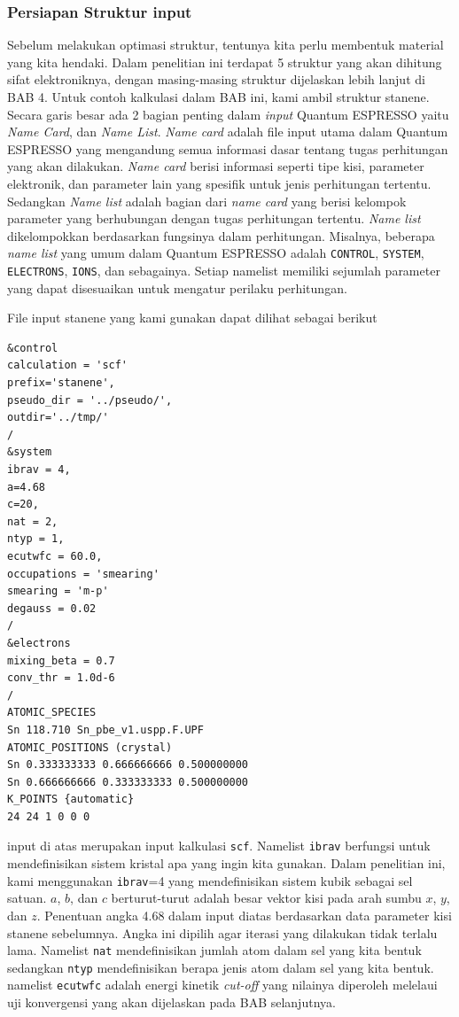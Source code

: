 \subsubsection{Persiapan Struktur input}
Sebelum melakukan optimasi struktur, tentunya kita perlu membentuk material yang kita hendaki. Dalam penelitian ini terdapat 5 struktur yang akan dihitung sifat elektroniknya, dengan masing-masing struktur dijelaskan lebih lanjut di BAB 4. Untuk contoh kalkulasi dalam BAB ini, kami ambil struktur stanene. Secara garis besar ada 2 bagian penting dalam \textit{input} Quantum ESPRESSO yaitu \textit{Name Card}, dan \textit{Name List}. \textit{Name card} adalah file input utama dalam Quantum ESPRESSO yang mengandung semua informasi dasar tentang tugas perhitungan yang akan dilakukan. \textit{Name card} berisi informasi seperti tipe kisi, parameter elektronik, dan parameter lain yang spesifik untuk jenis perhitungan tertentu. Sedangkan \textit{Name list} adalah bagian dari \textit{name card} yang berisi kelompok parameter yang berhubungan dengan tugas perhitungan tertentu. \textit{Name list} dikelompokkan berdasarkan fungsinya dalam perhitungan. Misalnya, beberapa \textit{name list} yang umum dalam Quantum ESPRESSO adalah \texttt{CONTROL}, \texttt{SYSTEM}, \texttt{ELECTRONS}, \texttt{IONS}, dan sebagainya. Setiap namelist memiliki sejumlah parameter yang dapat disesuaikan untuk mengatur perilaku perhitungan.

File input stanene yang kami gunakan dapat dilihat sebagai berikut
\begin{lstlisting}
&control
calculation = 'scf'
prefix='stanene',
pseudo_dir = '../pseudo/',
outdir='../tmp/'
/
&system
ibrav = 4,
a=4.68
c=20,
nat = 2,
ntyp = 1,
ecutwfc = 60.0,
occupations = 'smearing'
smearing = 'm-p'
degauss = 0.02
/
&electrons
mixing_beta = 0.7
conv_thr = 1.0d-6
/
ATOMIC_SPECIES
Sn 118.710 Sn_pbe_v1.uspp.F.UPF
ATOMIC_POSITIONS (crystal)
Sn 0.333333333 0.666666666 0.500000000
Sn 0.666666666 0.333333333 0.500000000
K_POINTS {automatic}
24 24 1 0 0 0
\end{lstlisting}
input di atas merupakan input kalkulasi \texttt{scf}. Namelist \texttt{ibrav} berfungsi untuk mendefinisikan sistem kristal apa yang ingin kita gunakan. Dalam penelitian ini, kami menggunakan \texttt{ibrav}=4 yang mendefinisikan sistem kubik sebagai sel satuan. $a$, $b$, dan $c$ berturut-turut adalah besar vektor kisi pada arah sumbu $x$, $y$, dan $z$. Penentuan angka 4.68 dalam input diatas berdasarkan data parameter kisi stanene sebelumnya. Angka ini dipilih agar iterasi yang dilakukan tidak terlalu lama. Namelist \texttt{nat} mendefinisikan jumlah atom dalam sel yang kita bentuk sedangkan \texttt{ntyp} mendefinisikan berapa jenis atom dalam sel yang kita bentuk. namelist \texttt{ecutwfc} adalah energi kinetik \textit{cut-off} yang nilainya diperoleh melelaui uji konvergensi yang akan dijelaskan pada BAB selanjutnya.

